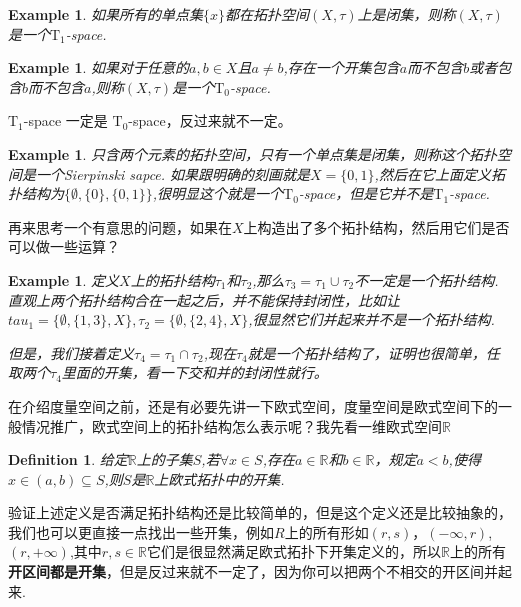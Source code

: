 \documentclass{article}
\newtheorem{example}[theorem]{Example}
\newtheorem{definition}[theorem]{Definition}
\begin{document}
\begin{example}
如果所有的单点集$\{x\}$都在拓扑空间$(X,\tau)$上是闭集，则称$(X,\tau)$是一个$\text{T}_1$-space.
\end{example}

\begin{example}
如果对于任意的$a,b \in X$且$a \neq b$,存在一个开集包含$a$而不包含$b$或者包含$b$而不包含$a$,则称$(X,\tau)$是一个$\text{T}_0$-space.
\end{example}

$\text{T}_1$-space 一定是 $\text{T}_0$-space，反过来就不一定。

\begin{example}
只含两个元素的拓扑空间，只有一个单点集是闭集，则称这个拓扑空间是一个Sierpinski sapce. 如果跟明确的刻画就是$X = \{0,1\}$,然后在它上面定义拓扑结构为$\{\emptyset,\{0\},\{0,1\}\}$,很明显这个就是一个$\text{T}_0$-space，但是它并不是$\text{T}_1$-space.
\end{example}

再来思考一个有意思的问题，如果在$X$上构造出了多个拓扑结构，然后用它们是否可以做一些运算？

\begin{example}
定义$X$上的拓扑结构$\tau_1$和$\tau_2$,那么$\tau_3 = \tau_1 \cup \tau_2$不一定是一个拓扑结构. 直观上两个拓扑结构合在一起之后，并不能保持封闭性，比如让$tau_1=\{\emptyset,\{1,3\},X\}, \tau_2 = \{\emptyset,\{2,4\},X\}$,很显然它们并起来并不是一个拓扑结构.

但是，我们接着定义$\tau_4 = \tau_1 \cap \tau_2$,现在$\tau_4$就是一个拓扑结构了，证明也很简单，任取两个$\tau_4$里面的开集，看一下交和并的封闭性就行。
\end{example}


在介绍度量空间之前，还是有必要先讲一下欧式空间，度量空间是欧式空间下的一般情况推广，欧式空间上的拓扑结构怎么表示呢？我先看一维欧式空间$\mathbb{R}$

\begin{definition}
给定$\mathbb{R}$上的子集$S$,若$\forall x \in S$,存在$a \in \mathbb{R}$和$b \in \mathbb{R}$，规定$a < b$,使得$x \in (a,b) \subseteq S$,则$S$是$\mathbb{R}$上欧式拓扑中的开集.
\end{definition}

验证上述定义是否满足拓扑结构还是比较简单的，但是这个定义还是比较抽象的，我们也可以更直接一点找出一些开集，例如$R$上的所有形如$(r,s)$，$(-\infty,r)$,$(r,+\infty)$,其中$r,s \in \mathbb{R}$它们是很显然满足欧式拓扑下开集定义的，所以$\mathbb{R}$上的所有\textbf{开区间都是开集}，但是反过来就不一定了，因为你可以把两个不相交的开区间并起来.
\end{document}
